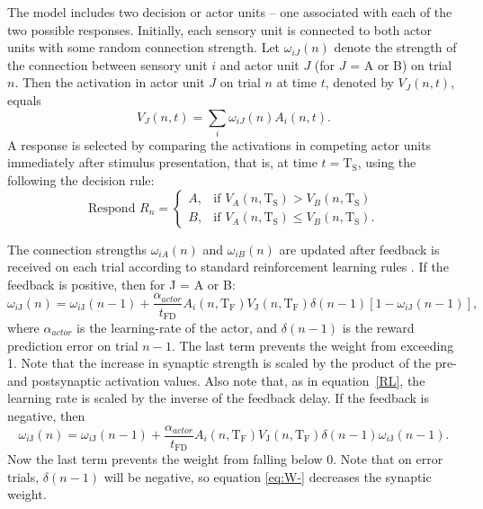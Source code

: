 \documentclass[doc, floatsintext]{apa7}
\begin{document}
The model includes two decision or actor units -- one
associated with each of the two possible responses.
Initially, each sensory unit is connected to both actor
units with some random connection strength. Let
$\omega_{iJ}(n)$ denote the strength of the connection
between sensory unit $i$ and actor unit $J$ (for $J$ = A or
B) on trial $n$. Then the activation in actor unit $J$ on
trial $n$ at time $t$, denoted by $V_J(n,t)$, equals
\begin{equation}
  V_J(n,t) = \sum_{i} \omega_{iJ}(n) A_i(n,t).
\end{equation}
A response is selected by comparing the activations in
competing actor units immediately after stimulus
presentation, that is, at time $t=\text{T}_\text{S}$,  using
the following the decision rule:
\begin{equation}
 \text{Respond } R_n =
  \begin{cases}
    A, & \text{if $V_A(n,\text{T}_\text{S}) > V_B(n,\text{T}_\text{S})$}\\
    B, & \text{if $V_A(n,\text{T}_\text{S}) \leq V_B(n,\text{T}_\text{S}).$}
  \end{cases}
\end{equation}

The connection strengths $\omega_{iA}(n)$ and
$\omega_{iB}(n)$ are updated after feedback is received on
each trial according to standard reinforcement learning
rules \parencite{SuttonBarto1998}. If the feedback is
positive, then for J = A or B:
\begin{equation}
  \omega_{i\text{J}}(n) = \omega_{i\text{J}}(n-1) + \frac{\alpha_{actor}}{t_\text{FD}} A_i(n,\text{T}_\text{F}) V_\text{J}(n,\text{T}_\text{F}) \delta(n-1) [1-\omega_{i\text{J}}(n-1)],
  \label{eq:W+}
\end{equation}
where $\alpha_{actor}$ is the learning-rate of the actor,
and $\delta(n-1)$ is the reward prediction error on trial
$n-1$. The last term prevents the weight from exceeding 1.
Note that the increase in synaptic strength is scaled by the
product of the pre- and postsynaptic activation values. Also
note that, as in equation~\ref{RL}, the learning rate is
scaled by the inverse of the feedback delay. If the feedback
is negative, then 
\begin{equation}
  \omega_{i\text{J}}(n) = \omega_{i\text{J}}(n-1) + \frac{\alpha_{actor}}{t_\text{FD}} A_i(n,\text{T}_\text{F}) V_\text{J}(n,\text{T}_\text{F}) \delta(n-1) \omega_{i\text{J}}(n-1).
  \label{eq:W-}
\end{equation}
Now the last term prevents the weight from falling below 0.
Note that on error trials, $\delta(n-1)$ will be negative,
so equation \ref{eq:W-} decreases the synaptic weight.
\end{document}
